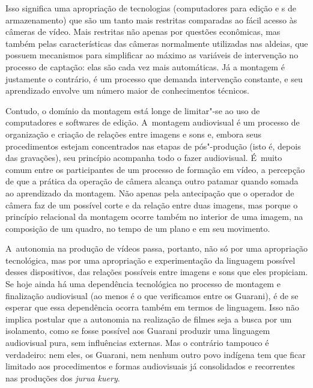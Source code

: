 Isso significa uma apropriação de tecnologias (computadores para edição
e s de armazenamento) que são um tanto mais restritas
comparadas ao fácil acesso às câmeras de vídeo. Mais restritas não
apenas por questões econômicas, mas também pelas características das
câmeras normalmente utilizadas nas aldeias, que possuem mecanismos para
simplificar ao máximo as variáveis de intervenção no processo de
captação: elas são cada vez mais automáticas. Já a montagem é
justamente o contrário, é um processo que demanda intervenção
constante, e seu aprendizado envolve um número maior de conhecimentos
técnicos.

Contudo, o domínio da montagem está longe de limitar"-se ao uso de
computadores e softwares de edição. A~montagem audiovisual é um
processo de organização e criação de relações entre imagens e sons e,
embora seus procedimentos estejam concentrados nas etapas de
pós"-produção (isto é, depois das gravações), seu princípio acompanha
todo o fazer audiovisual. É~muito comum entre os participantes de um
processo de formação em vídeo, a percepção de que a prática da operação
de câmera alcança outro patamar quando somada ao aprendizado da
montagem. Não apenas pela antecipação que o operador de câmera faz de
um possível corte e da relação entre duas imagens, mas porque o
princípio relacional da montagem ocorre também no interior de uma
imagem, na composição de um quadro, no tempo de um plano e em seu
movimento.

A~autonomia na produção de vídeos passa, portanto, não só por uma
apropriação tecnológica, mas por uma apropriação e experimentação da
linguagem possível desses dispositivos, das relações possíveis entre
imagens e sons que eles propiciam. Se hoje ainda há uma dependência
tecnológica no processo de montagem e finalização audiovisual (ao menos
é o que verificamos entre os Guarani), é de se esperar que essa
dependência ocorra também em termos de linguagem. Isso não implica
postular que a autonomia na realização de filmes seja a busca por um
isolamento, como se fosse possível aos Guarani produzir uma linguagem
audiovisual pura, sem influências externas. Mas o contrário tampouco é
verdadeiro: nem eles, os Guarani, nem nenhum outro povo indígena tem
que ficar limitado aos procedimentos e formas audiovisuais já
consolidados e recorrentes nas produções dos \emph{jurua kuery}.

